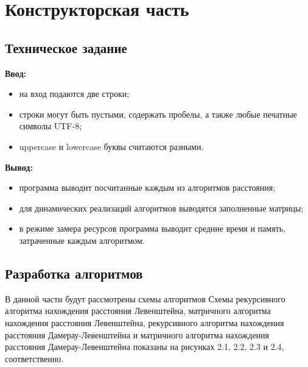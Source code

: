 \documentclass[12pt, a4paper]{report}
\begin{document}
\chapter{Конструкторская часть}
\section{Техническое задание}
\textbf{Ввод:}
\begin{itemize}
  	\item на вход подаются две строки;
  	\item строки могут быть пустыми, содержать пробелы, а также любые печатные символы UTF-8;
	\item uppercase и lowercase буквы считаются разными.
\end{itemize}
\textbf{Вывод:}
\begin{itemize}
  	\item программа выводит посчитанные каждым из алгоритмов расстояния;
  	\item для динамических реализаций алгоритмов выводятся заполненные матрицы;
  	\item в режиме замера ресурсов программа выводит средние время и память, затраченные каждым алгоритмом. 
\end{itemize}
\section{Разработка алгоритмов}
В данной части будут рассмотрены схемы алгоритмов Схемы рекурсивного алгоритма нахождения расстояния Левенштейна, матричного алгоритма нахождения расстояния Левенштейна, рекурсивного алгоритма нахождения расстояния Дамерау-Левенштейна и матричного алгоритма нахождения расстояния Дамерау-Левенштейна показаны на рисунках 2.1, 2.2, 2.3 и 2.4, соответственно.
\end{document}
